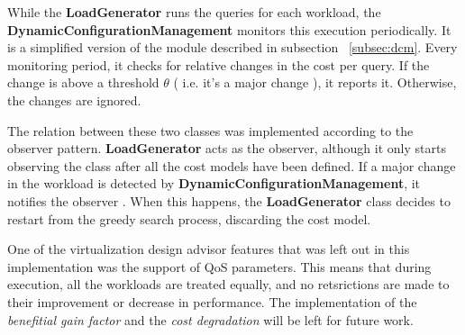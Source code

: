 While the \textbf{LoadGenerator} runs the queries for each workload, the \textbf{DynamicConfigurationManagement} monitors this execution periodically. 
It is a simplified version of the module described in subsection ~\ref{subsec:dcm}. Every monitoring period, it checks for relative changes in the cost per query. If the change is above a threshold $\theta$ ( i.e. it's a major change ), it reports it. Otherwise, the changes are ignored.

The relation between these two classes was implemented according to the observer pattern. \textbf{LoadGenerator} acts as the observer, although it only starts observing the class after all the cost models have been defined. If a major change in the workload is detected by \textbf{DynamicConfigurationManagement}, it notifies the observer . When this happens, the \textbf{LoadGenerator} class decides to restart from the greedy search process, discarding the cost model.

One of the virtualization design advisor  features that was left out in this implementation was the support of QoS parameters. This means that during execution, all the workloads are treated equally, and no retsrictions are made to their improvement or decrease in performance. The implementation of the \textit{benefitial gain factor} and the \textit{cost degradation} will be left for future work.






